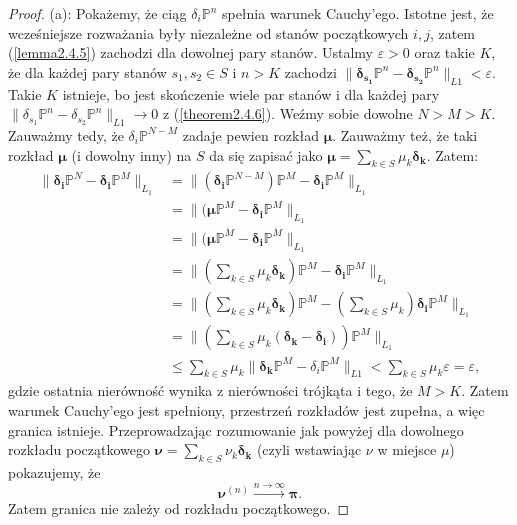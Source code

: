 \documentclass[a4paper]{article}
\theoremstyle{defn}
\theoremstyle{theorem}
\theoremstyle{lemma}
\theoremstyle{cor}
\theoremstyle{fact}
\begin{document}
\begin{proof}
(a): Pokażemy, że ciąg $\delta_i\mathbb{P}^n$ spełnia warunek Cauchy'ego. Istotne jest, że wcześniejsze rozważania były niezależne od stanów początkowych $i, j$, zatem (\ref{lemma2.4.5}) zachodzi dla dowolnej pary stanów. Ustalmy $\varepsilon > 0$ oraz takie $K$, że dla każdej pary stanów $s_1, s_2 \in S$ i $n > K$  zachodzi $\|\boldsymbol{\delta_{s_1}}\mathbb{P}^n - \boldsymbol{\delta_{s_2}}\mathbb{P}^n\|_{L1} < \varepsilon$. Takie $K$ istnieje, bo jest skończenie wiele par stanów i dla każdej pary $\|\delta_{s_1}\mathbb{P}^n - \delta_{s_2}\mathbb{P}^n\|_{L1} \to 0$ z (\ref{theorem2.4.6}). Weźmy sobie dowolne $N > M > K$. Zauważmy tedy, że $\delta_i\mathbb{P}^{N-M}$ zadaje pewien rozkład $\boldsymbol{\mu}$. Zauważmy też, że taki rozkład $\boldsymbol{\mu}$ (i dowolny inny) na $S$ da się zapisać jako $\boldsymbol{\mu} = \sum\limits_{k \in S} \mu_k\boldsymbol{\delta_k}$. Zatem:
\begin{align*}
\|\boldsymbol{\delta_i}\mathbb{P}^N - \boldsymbol{\delta_i}\mathbb{P}^M\|_{L_1} &= \|(\boldsymbol{\delta_i}\mathbb{P}^{N-M})\mathbb{P}^{M} - \boldsymbol{\delta_i}\mathbb{P}^M\|_{L_1}\\
&= \|(\boldsymbol{\mu}\mathbb{P}^{M} - \boldsymbol{\delta_i}\mathbb{P}^M\|_{L_1} \\
&= \|(\boldsymbol{\mu}\mathbb{P}^{M} - \boldsymbol{\delta_i}\mathbb{P}^M\|_{L_1} \\
&= \|(\sum\limits_{k \in S} \mu_k\boldsymbol{\delta_k})\mathbb{P}^{M} - \boldsymbol{\delta_i}\mathbb{P}^M\|_{L_1} \\
&= \|(\sum\limits_{k \in S} \mu_k\boldsymbol{\delta_k})\mathbb{P}^{M} - (\sum\limits_{k \in S} \mu_k)\boldsymbol{\delta_i}\mathbb{P}^M\|_{L_1} \\
&= \|(\sum\limits_{k \in S} \mu_k(\boldsymbol{\delta_k} - \boldsymbol{\delta_i}))\mathbb{P}^{M}\|_{L_1}  \\
&\leq  \sum\limits_{k \in S} \mu_k\|\boldsymbol{\delta_k}\mathbb{P}^M - \delta_i\mathbb{P}^M\|_{L1} < \sum\limits_{k \in S} \mu_k\varepsilon = \varepsilon,
\end{align*}
gdzie ostatnia nierówność wynika z nierówności trójkąta i tego, że $M > K$. Zatem warunek Cauchy'ego jest spełniony, przestrzeń rozkładów jest zupełna, a więc granica istnieje. Przeprowadzając rozumowanie jak powyżej dla dowolnego rozkładu początkowego $\boldsymbol{\nu} = \sum\limits_{k \in S} \nu_k\boldsymbol{\delta_k}$ (czyli wstawiając $\nu$ w miejsce $\mu$) pokazujemy, że $$\boldsymbol{\nu}^{(n)} \xrightarrow{n \to \infty} \boldsymbol{\pi}.$$ Zatem granica nie zależy od rozkładu początkowego.
\end{proof}
\end{document}
